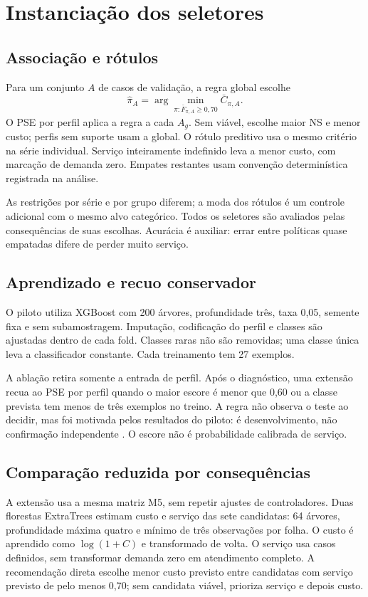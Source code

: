 \section{Instanciação dos seletores}
\label{sec:selecao_contextual}
\subsection{Associação e rótulos}
Para um conjunto $A$ de casos de validação, a regra global escolhe
\begin{equation}
 \hat\pi_A=\arg\min_{\pi:\bar F_{\pi,A}\geq0{,}70}\bar C_{\pi,A}.
 \label{eq:policy_selector}
\end{equation}
O PSE por perfil aplica a regra a cada $A_g$. Sem viável, escolhe maior NS e menor custo; perfis sem suporte usam a global. O rótulo preditivo usa o mesmo critério na série individual. Serviço inteiramente indefinido leva a menor custo, com marcação de demanda zero. Empates restantes usam convenção determinística registrada na análise.

As restrições por série e por grupo diferem; a moda dos rótulos é um controle adicional com o mesmo alvo categórico. Todos os seletores são avaliados pelas consequências de suas escolhas. Acurácia é auxiliar: errar entre políticas quase empatadas difere de perder muito serviço.

\subsection{Aprendizado e recuo conservador}
O piloto utiliza XGBoost com 200 árvores, profundidade três, taxa 0,05, semente fixa e sem subamostragem. Imputação, codificação do perfil e classes são ajustadas dentro de cada fold. Classes raras não são removidas; uma classe única leva a classificador constante. Cada treinamento tem 27 exemplos.

A ablação retira somente a entrada de perfil. Após o diagnóstico, uma extensão recua ao PSE por perfil quando o maior escore é menor que 0,60 ou a classe prevista tem menos de três exemplos no treino. A regra não observa o teste ao decidir, mas foi motivada pelos resultados do piloto: é desenvolvimento, não confirmação independente \citep{CawleyTalbot2010}. O escore não é probabilidade calibrada de serviço.

\subsection{Comparação reduzida por consequências}
A extensão usa a mesma matriz M5, sem repetir ajustes de controladores. Duas florestas ExtraTrees estimam custo e serviço das sete candidatas: 64 árvores, profundidade máxima quatro e mínimo de três observações por folha. O custo é aprendido como $\log(1+C)$ e transformado de volta. O serviço usa casos definidos, sem transformar demanda zero em atendimento completo. A recomendação direta escolhe menor custo previsto entre candidatas com serviço previsto de pelo menos 0,70; sem candidata viável, prioriza serviço e depois custo.

